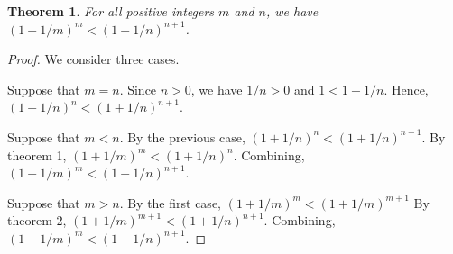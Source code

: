 \documentclass[12pt]{article}
\newtheorem{thm}{Theorem}
\begin{document}
\begin{thm}
For all positive integers $m$ and $n$, we have $(1 + 1/m)^{m} < (1 + 1/n)^{n+1}$.
\end{thm}

\begin{proof}
We consider three cases.

Suppose that $m = n$.  Since $n > 0$, we have $1/n >0$ and $1 < 1 + 1/n$.  Hence,
$(1 + 1/n)^{n} < (1 + 1/n)^{n+1}$.

Suppose that $m < n$.  By the previous case, $(1 + 1/n)^{n} < (1 + 1/n)^{n+1}$.
By theorem 1, $(1 + 1/m)^{m} < (1 + 1/n)^{n}$.  Combining,
$(1 + 1/m)^{m} < (1 + 1/n)^{n+1}$.

Suppose that $m > n$.
By the first case, $(1 + 1/m)^{m} <(1 + 1/m)^{m+1}$
By theorem 2, $(1 + 1/m)^{m+1} < (1 + 1/n)^{n+1}$.
Combining, $(1 + 1/m)^{m} < (1 + 1/n)^{n+1}$.
\end{proof}

\end{document}
